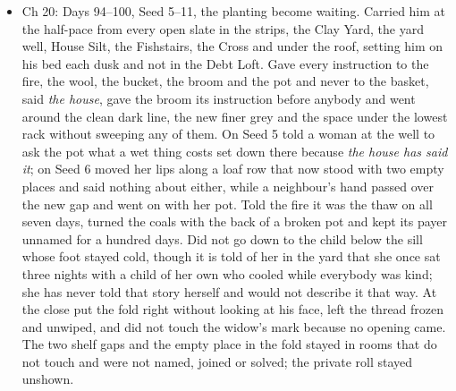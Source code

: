\documentclass{design/chronicle}
\begin{document}
{\begin{itemize}[leftmargin=1.4em,itemsep=1pt,topsep=3pt,parsep=0pt]
\item Ch 20: Days 94–100, Seed 5–11, the planting become waiting. Carried him at the half-pace from every open slate in the strips, the Clay Yard, the yard well, House Silt, the Fishstairs, the Cross and under the roof, setting him on his bed each dusk and not in the Debt Loft. Gave every instruction to the fire, the wool, the bucket, the broom and the pot and never to the basket, said \emph{the house}, gave the broom its instruction before anybody and went around the clean dark line, the new finer grey and the space under the lowest rack without sweeping any of them. On Seed 5 told a woman at the well to ask the pot what a wet thing costs set down there because \emph{the house has said it}; on Seed 6 moved her lips along a loaf row that now stood with two empty places and said nothing about either, while a neighbour’s hand passed over the new gap and went on with her pot. Told the fire it was the thaw on all seven days, turned the coals with the back of a broken pot and kept its payer unnamed for a hundred days. Did not go down to the child below the sill whose foot stayed cold, though it is told of her in the yard that she once sat three nights with a child of her own who cooled while everybody was kind; she has never told that story herself and would not describe it that way. At the close put the fold right without looking at his face, left the thread frozen and unwiped, and did not touch the widow’s mark because no opening came. The two shelf gaps and the empty place in the fold stayed in rooms that do not touch and were not named, joined or solved; the private roll stayed unshown.

\end{itemize}

\begin{itemize}[leftmargin=1.4em,itemsep=1pt,topsep=3pt,parsep=0pt]


\end{itemize}}
\end{document}
